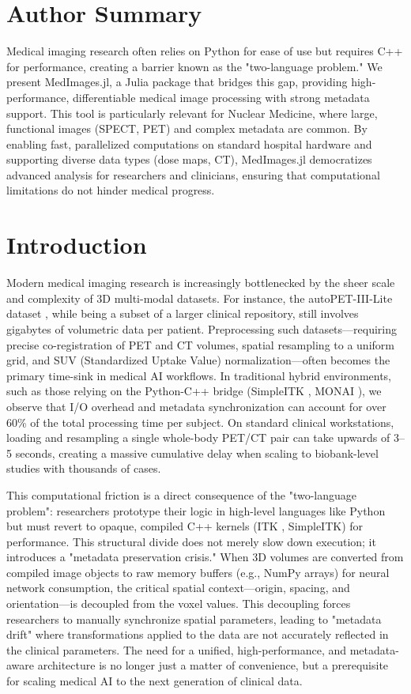 \documentclass[10pt,letterpaper]{article}
\begin{document}
\section*{Author Summary}
Medical imaging research often relies on Python for ease of use but requires C++ for performance, creating a barrier known as the "two-language problem." We present MedImages.jl, a Julia package that bridges this gap, providing high-performance, differentiable medical image processing with strong metadata support. This tool is particularly relevant for Nuclear Medicine, where large, functional images (SPECT, PET) and complex metadata are common. By enabling fast, parallelized computations on standard hospital hardware and supporting diverse data types (dose maps, CT), MedImages.jl democratizes advanced analysis for researchers and clinicians, ensuring that computational limitations do not hinder medical progress.

\section*{Introduction}
Modern medical imaging research is increasingly bottlenecked by the sheer scale and complexity of 3D multi-modal datasets. For instance, the autoPET-III-Lite dataset \cite{Gatidis_2024}, while being a subset of a larger clinical repository, still involves gigabytes of volumetric data per patient. Preprocessing such datasets—requiring precise co-registration of PET and CT volumes, spatial resampling to a uniform grid, and SUV (Standardized Uptake Value) normalization—often becomes the primary time-sink in medical AI workflows. In traditional hybrid environments, such as those relying on the Python-C++ bridge (SimpleITK \cite{LowekampChen2013}, MONAI \cite{CardosoLi2022}), we observe that I/O overhead and metadata synchronization can account for over 60\% of the total processing time per subject. On standard clinical workstations, loading and resampling a single whole-body PET/CT pair can take upwards of 3--5 seconds, creating a massive cumulative delay when scaling to biobank-level studies with thousands of cases.

This computational friction is a direct consequence of the "two-language problem": researchers prototype their logic in high-level languages like Python but must revert to opaque, compiled C++ kernels (ITK \cite{itk}, SimpleITK) for performance. This structural divide does not merely slow down execution; it introduces a "metadata preservation crisis." When 3D volumes are converted from compiled image objects to raw memory buffers (e.g., NumPy arrays) for neural network consumption, the critical spatial context—origin, spacing, and orientation—is decoupled from the voxel values. This decoupling forces researchers to manually synchronize spatial parameters, leading to "metadata drift" where transformations applied to the data are not accurately reflected in the clinical parameters. The need for a unified, high-performance, and metadata-aware architecture is no longer just a matter of convenience, but a prerequisite for scaling medical AI to the next generation of clinical data.
\end{document}
